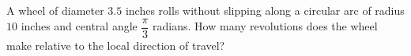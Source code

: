 A wheel of diameter $3.5$ inches rolls without slipping along a circular arc of radius $10$ inches and central angle $\dfrac{\pi}{3}$ radians. How many revolutions does the wheel make relative to the local direction of travel?
